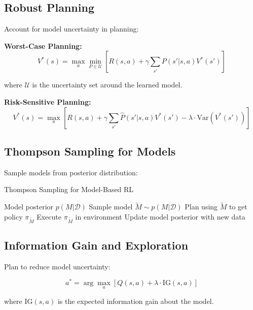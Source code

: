 \subsection{Robust Planning}

Account for model uncertainty in planning:

\textbf{Worst-Case Planning:}
\begin{equation}
V^*(s) = \max_a \min_{P \in \mathcal{U}} \left[ R(s,a) + \gamma \sum_{s'} P(s'|s,a) V^*(s') \right]
\end{equation}

where $\mathcal{U}$ is the uncertainty set around the learned model.

\textbf{Risk-Sensitive Planning:}
\begin{equation}
V^*(s) = \max_a \left[ R(s,a) + \gamma \sum_{s'} \hat{P}(s'|s,a) V^*(s') - \lambda \cdot \text{Var}(V^*(s')) \right]
\end{equation}

\subsection{Thompson Sampling for Models}

Sample models from posterior distribution:

\begin{algorithm}
\caption{Thompson Sampling for Model-Based RL}
\begin{algorithmic}
\REQUIRE Model posterior $p(M|\mathcal{D})$
    \STATE Sample model $\tilde{M} \sim p(M|\mathcal{D})$
    \STATE Plan using $\tilde{M}$ to get policy $\pi_{\tilde{M}}$
    \STATE Execute $\pi_{\tilde{M}}$ in environment
    \STATE Update model posterior with new data
\ENDFOR
\end{algorithmic}
\end{algorithm}

\subsection{Information Gain and Exploration}

Plan to reduce model uncertainty:

\begin{equation}
a^* = \arg\max_a \left[ Q(s,a) + \lambda \cdot \text{IG}(s,a) \right]
\end{equation}

where $\text{IG}(s,a)$ is the expected information gain about the model.

